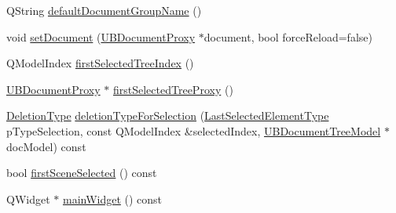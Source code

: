 \begin{DoxyCompactItemize}
\item 
Q\-String \hyperlink{class_u_b_document_controller_a71b3e2e82105ae765e6d3e53012c702a}{default\-Document\-Group\-Name} ()
\item 
void \hyperlink{class_u_b_document_controller_a097804748c35b992649703b34879f93a}{set\-Document} (\hyperlink{class_u_b_document_proxy}{U\-B\-Document\-Proxy} $\ast$document, bool force\-Reload=false)
\item 
Q\-Model\-Index \hyperlink{class_u_b_document_controller_ae66d6637a55e6b886c6c1e658f7f3eb2}{first\-Selected\-Tree\-Index} ()
\item 
\hyperlink{class_u_b_document_proxy}{U\-B\-Document\-Proxy} $\ast$ \hyperlink{class_u_b_document_controller_aadb04f4c4251bd9d381065705f8da7e4}{first\-Selected\-Tree\-Proxy} ()
\item 
\hyperlink{class_u_b_document_controller_ad7fc793af571ee4203a71db414e0829e}{Deletion\-Type} \hyperlink{class_u_b_document_controller_a400a67271554e9a960c70a5124164b94}{deletion\-Type\-For\-Selection} (\hyperlink{class_u_b_document_controller_a817080b199ec90e8d8133cef019c7306}{Last\-Selected\-Element\-Type} p\-Type\-Selection, const Q\-Model\-Index \&selected\-Index, \hyperlink{class_u_b_document_tree_model}{U\-B\-Document\-Tree\-Model} $\ast$doc\-Model) const 
\item 
bool \hyperlink{class_u_b_document_controller_accc0789631bbb7846e00bcfacd57e930}{first\-Scene\-Selected} () const 
\item 
Q\-Widget $\ast$ \hyperlink{class_u_b_document_controller_ac2464662429782bdebbf335b6dd300db}{main\-Widget} () const 
\end{DoxyCompactItemize}
